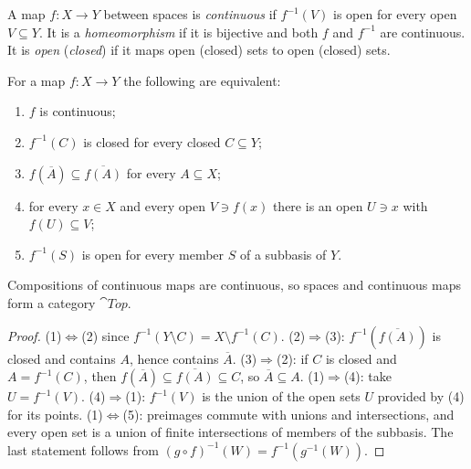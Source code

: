 \begin{definition}\label{general-topology:definition-continuous}
A map $f \colon X \to Y$ between spaces is \emph{continuous} if $f^{-1}(V)$ is open for every open $V \subseteq Y$. It is a
\emph{homeomorphism} if it is bijective and both $f$ and $f^{-1}$ are continuous. It is \emph{open} (\emph{closed}) if it maps open
(closed) sets to open (closed) sets.
\end{definition}

\begin{proposition}\label{general-topology:proposition-continuity}
For a map $f \colon X \to Y$ the following are equivalent:
\begin{enumerate}
\item $f$ is continuous;
\item $f^{-1}(C)$ is closed for every closed $C \subseteq Y$;
\item $f(\overline{A}) \subseteq \overline{f(A)}$ for every $A \subseteq X$;
\item for every $x \in X$ and every open $V \ni f(x)$ there is an open $U \ni x$ with $f(U) \subseteq V$;
\item $f^{-1}(S)$ is open for every member $S$ of a subbasis of $Y$.
\end{enumerate}
Compositions of continuous maps are continuous, so spaces and continuous maps form a category $\cat{Top}$.
\end{proposition}

\begin{proof}
(1)$\Leftrightarrow$(2) since $f^{-1}(Y \setminus C) = X \setminus f^{-1}(C)$. (2)$\Rightarrow$(3): $f^{-1}(\overline{f(A)})$ is closed and contains
$A$, hence contains $\overline{A}$. (3)$\Rightarrow$(2): if $C$ is closed and $A = f^{-1}(C)$, then $f(\overline{A}) \subseteq \overline{f(A)} \subseteq C$,
so $\overline{A} \subseteq A$. (1)$\Rightarrow$(4): take $U = f^{-1}(V)$. (4)$\Rightarrow$(1): $f^{-1}(V)$ is the union of the open sets $U$ provided
by (4) for its points. (1)$\Leftrightarrow$(5): preimages commute with unions and intersections, and every open set is a union of finite
intersections of members of the subbasis. The last statement follows from $(g \circ f)^{-1}(W) = f^{-1}(g^{-1}(W))$.
\end{proof}

